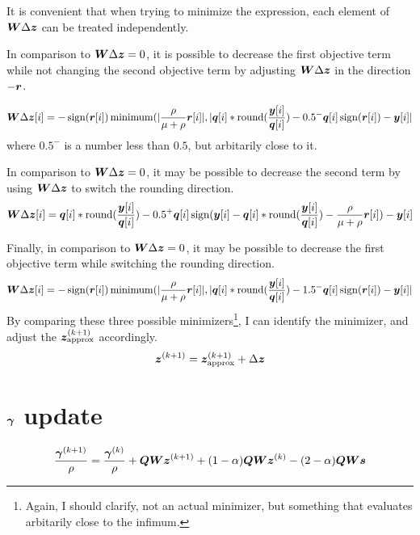 \documentclass{article}
\begin{document}
It is convenient that when trying to minimize the expression, each element of $\bm{W}\Delta\bm{z}$ can be treated independently.

In comparison to $\bm{W}\Delta\bm{z} = 0$, it is possible to decrease the first objective term while not changing the second objective term by adjusting $\bm{W}\Delta\bm{z}$ in the direction $-\bm{r}$.

\begin{equation}
\bm{W}\Delta\bm{z}[i] = -\operatorname{sign}(\bm{r}[i])\operatorname{minimum}(|\frac{\rho}{\mu + \rho}\bm{r}[i]|,|\bm{q}[i]*\operatorname{round}(\frac{\bm{y}[i]}{\bm{q}[i]}) - 0.5^{-}\bm{q}[i]\operatorname{sign}(\bm{r}[i]) - \bm{y}[i]|
\end{equation}
where $0.5^{-}$ is a number less than $0.5$, but arbitarily close to it.

In comparison to $\bm{W}\Delta\bm{z} = 0$, it may be possible to decrease the second term by using $\bm{W}\Delta\bm{z}$ to switch the rounding direction.
\begin{equation}
\bm{W}\Delta\bm{z}[i] = \bm{q}[i]*\operatorname{round}(\frac{\bm{y}[i]}{\bm{q}[i]}) - 0.5^{+}\bm{q}[i]\operatorname{sign}(\bm{y}[i] - \bm{q}[i]*\operatorname{round}(\frac{\bm{y}[i]}{\bm{q}[i]}) - \frac{\rho}{\mu + \rho}\bm{r}[i]) - \bm{y}[i]
\end{equation}

Finally, in comparison to $\bm{W}\Delta\bm{z} = 0$, it may be possible to decrease the first objective term while switching the rounding direction.
\begin{equation}
\bm{W}\Delta\bm{z}[i] = -\operatorname{sign}(\bm{r}[i])\operatorname{minimum}(|\frac{\rho}{\mu + \rho}\bm{r}[i]|,|\bm{q}[i]*\operatorname{round}(\frac{\bm{y}[i]}{\bm{q}[i]}) - 1.5^{-}\bm{q}[i]\operatorname{sign}(\bm{r}[i]) - \bm{y}[i]|
\end{equation}
By comparing these three possible minimizers\footnote{Again, I should clarify, not an actual minimizer, but something that evaluates arbitarily close to the infimum.}, I can identify the minimizer, and adjust the $\bm{z}_{\text{approx}}^{(k + 1)}$ accordingly.
\begin{equation}
\bm{z}^{(k + 1)} = \bm{z}_{\text{approx}}^{(k + 1)} + \Delta\bm{z}
\end{equation}

\section{$\bm{\gamma}$ update}

\begin{equation}
\frac{\bm{\gamma}^{(k + 1)}}{\rho} = \frac{\bm{\gamma}^{(k)}}{\rho} + \bm{Q}\bm{W}\bm{z}^{(k + 1)} + (1 - \alpha)\bm{Q}\bm{W}\bm{z}^{(k)} - (2 - \alpha)\bm{Q}\bm{W}\bm{s} 
\end{equation}
\end{document}

